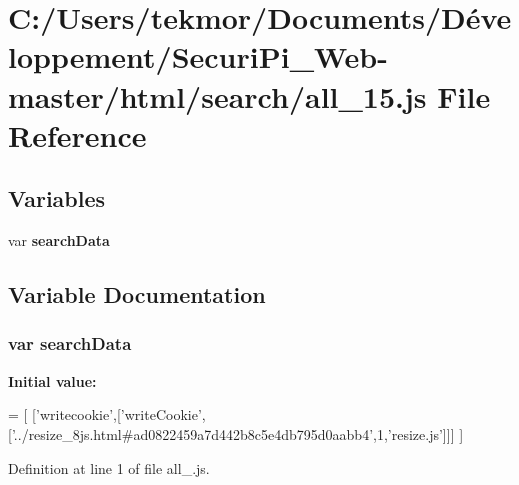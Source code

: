 \section{C\+:/\+Users/tekmor/\+Documents/\+Développement/\+Securi\+Pi\+\_\+\+Web-\/master/html/search/all\+\_\+15.js File Reference}
\label{all__15_8js}
\subsection*{Variables}
\begin{DoxyCompactItemize}
\item 
var {\bf search\+Data}
\end{DoxyCompactItemize}


\subsection{Variable Documentation}
\subsubsection[{search\+Data}]{\setlength{\rightskip}{0pt plus 5cm}var search\+Data}\label{all__15_8js_ad01a7523f103d6242ef9b0451861231e}
{\bfseries Initial value\+:}
\begin{DoxyCode}
=
[
  [\textcolor{stringliteral}{'writecookie'},[\textcolor{stringliteral}{'writeCookie'},[\textcolor{stringliteral}{'../resize\_8js.html#ad0822459a7d442b8c5e4db795d0aabb4'},1,\textcolor{stringliteral}{'resize.js'}]]]
]
\end{DoxyCode}


Definition at line 1 of file all\+\_.\+js.

